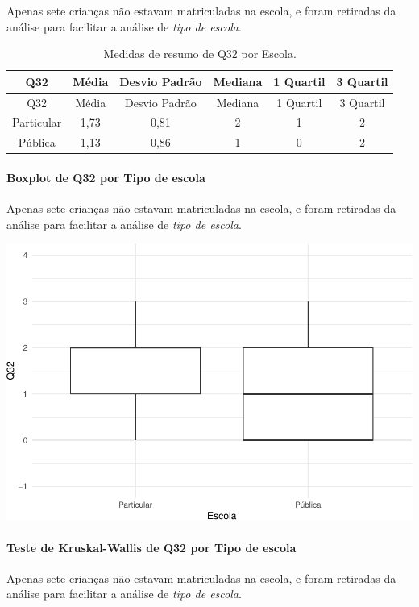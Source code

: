 \documentclass[]{article}
\let\oldparagraph\paragraph
\renewcommand{\paragraph}[1]{\oldparagraph{#1}\mbox{}}
\begin{document}
Apenas sete crianças não estavam matriculadas na escola, e foram retiradas da análise para facilitar a análise de \emph{tipo de escola}.

\begin{longtable}[]{@{}cccccc@{}}
\caption{\label{tab:unnamed-chunk-1119}Medidas de resumo de Q32 por Escola.}\tabularnewline
\toprule
Q32 & Média & Desvio Padrão & Mediana & 1 Quartil & 3 Quartil\tabularnewline
\midrule
\endfirsthead
\toprule
Q32 & Média & Desvio Padrão & Mediana & 1 Quartil & 3 Quartil\tabularnewline
\midrule
\endhead
Particular & 1,73 & 0,81 & 2 & 1 & 2\tabularnewline
Pública & 1,13 & 0,86 & 1 & 0 & 2\tabularnewline
\bottomrule
\end{longtable}

\hypertarget{boxplot-de-q32-por-tipo-de-escola}{%
\paragraph{Boxplot de Q32 por Tipo de escola}\label{boxplot-de-q32-por-tipo-de-escola}}

Apenas sete crianças não estavam matriculadas na escola, e foram retiradas da análise para facilitar a análise de \emph{tipo de escola}.

\begin{center}\includegraphics[width=0.75\linewidth]{relatorio_covid19_files/figure-latex/unnamed-chunk-1120-1} \end{center}

\hypertarget{teste-de-kruskal-wallis-de-q32-por-tipo-de-escola}{%
\paragraph{Teste de Kruskal-Wallis de Q32 por Tipo de escola}\label{teste-de-kruskal-wallis-de-q32-por-tipo-de-escola}}

Apenas sete crianças não estavam matriculadas na escola, e foram retiradas da análise para facilitar a análise de \emph{tipo de escola}.
\end{document}
